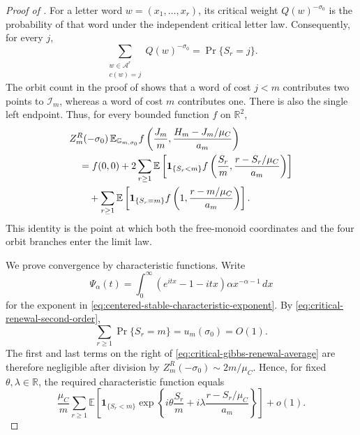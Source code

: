\begin{proof}[Proof of ]
For a letter word \(w=(x_1,\ldots,x_r)\), its critical weight
\(Q(w)^{-\sigma_0}\) is the probability of that word under the independent
critical letter law.  Consequently, for every \(j\),
\begin{equation}
 \sum_{\substack{w\in\mathcal A^r\\c(w)=j}}
 Q(w)^{-\sigma_0}=\Pr\{S_r=j\}.
 \label{eq:critical-word-probability}
\end{equation}
The orbit count in the proof of
 shows that a word of cost \(j<m\)
contributes two points to \(\mathcal I_m\), whereas a word of cost \(m\)
contributes one.  There is also the single left endpoint.  Thus, for every
bounded function \(f\) on \(\mathbb R^2\),
\begin{align}
 &Z_m^R(-\sigma_0)\,
 \mathbb E_{\mathbb G_{m,\sigma_0}}f\left(
       \frac{J_m}{m},\frac{H_m-J_m/\mu_C}{a_m}\right)
 \notag\\
 &\quad=f(0,0)
 +2\sum_{r\ge1}\mathbb E\left[
  \mathbf1_{\{S_r<m\}}
  f\left(\frac{S_r}{m},\frac{r-S_r/\mu_C}{a_m}\right)\right]
 \notag\\
 &\qquad
 +\sum_{r\ge1}\mathbb E\left[
  \mathbf1_{\{S_r=m\}}
  f\left(1,\frac{r-m/\mu_C}{a_m}\right)\right].
 \label{eq:critical-gibbs-renewal-average}
\end{align}
This identity is the point at which both the free-monoid coordinates and the
four orbit branches enter the limit law.

We prove convergence by characteristic functions.  Write
\[
 \Psi_\alpha(t)=
 \int_0^\infty(e^{itx}-1-itx)\alpha x^{-\alpha-1}\,dx
\]
for the exponent in
\eqref{eq:centered-stable-characteristic-exponent}.  By
\eqref{eq:critical-renewal-second-order},
\[
 \sum_{r\ge1}\Pr\{S_r=m\}=u_m(\sigma_0)=O(1).
\]
The first and last terms on the right of
\eqref{eq:critical-gibbs-renewal-average} are therefore negligible after
division by \(Z_m^R(-\sigma_0)\sim2m/\mu_C\).  Hence, for fixed
\(\theta,\lambda\in\mathbb R\), the required characteristic function equals
\begin{equation}
 \frac{\mu_C}{m}\sum_{r\ge1}
 \mathbb E\left[
  \mathbf1_{\{S_r<m\}}
  \exp\left\{i\theta\frac{S_r}{m}
       +i\lambda\frac{r-S_r/\mu_C}{a_m}\right\}\right]+o(1).
 \label{eq:critical-gibbs-characteristic-sum}
\end{equation}


\end{proof}
